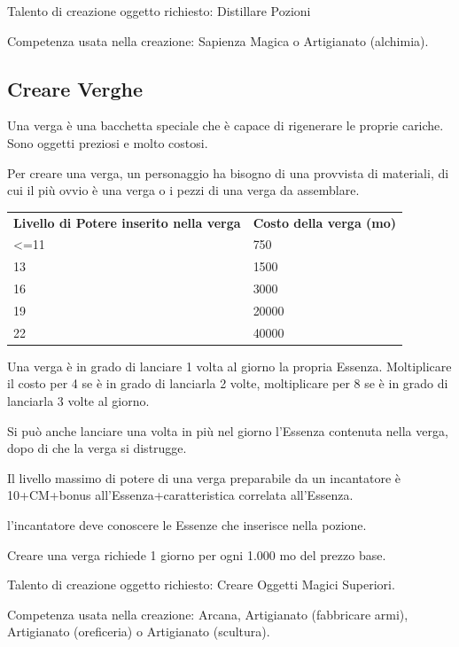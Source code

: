 \documentclass[a4paper,11pt,twoside,openany]{book}
\begin{document}
Talento di creazione oggetto richiesto: Distillare Pozioni

Competenza usata nella creazione: Sapienza Magica o Artigianato (alchimia).

\subsection{Creare Verghe}

Una verga è una bacchetta speciale che è capace di rigenerare le proprie cariche. Sono oggetti preziosi e molto costosi.

Per creare una verga, un personaggio ha bisogno di una provvista di materiali, di cui il più ovvio è una verga o i pezzi di una verga da assemblare.

\medskip

\begin{tabular}{ll}
	\toprule
	\textbf{Livello di Potere inserito nella verga} & \textbf{Costo della verga (mo)}\tabularnewline
	\textless=11                                    & 750\tabularnewline
	13                                              & 1500\tabularnewline
	16                                              & 3000\tabularnewline
	19                                              & 20000\tabularnewline
	22                                              & 40000\tabularnewline
\end{tabular}

\bigskip

Una verga è in grado di lanciare 1 volta al giorno la propria Essenza. Moltiplicare il costo per 4 se è in grado di lanciarla 2 volte, moltiplicare per 8 se è in grado di lanciarla 3 volte al giorno.

Si può anche lanciare una volta in più nel giorno l'Essenza contenuta nella verga, dopo di che la verga si distrugge.

Il livello massimo di potere di una verga preparabile da un incantatore è 10+CM+bonus all'Essenza+caratteristica correlata all'Essenza.

l'incantatore deve conoscere le Essenze che inserisce nella pozione.

Creare una verga richiede 1 giorno per ogni 1.000 mo del prezzo base.

Talento di creazione oggetto richiesto: Creare Oggetti Magici Superiori.

Competenza usata nella creazione: Arcana, Artigianato (fabbricare armi), Artigianato (oreficeria) o Artigianato (scultura).
\end{document}
